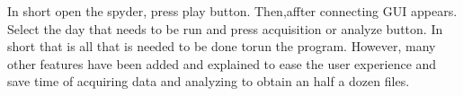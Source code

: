 \documentclass[12pt]{article}
\begin{document}
In short open the spyder, press play button. Then,affter connecting GUI appears. Select the day that needs to be run and press acquisition or analyze button. In short that is all that is needed to be done torun the program. However, many other features have been added and explained to ease the user experience and save time of acquiring data and analyzing to obtain an half a dozen files.

\newpage

\listoffigures
\end{document}
